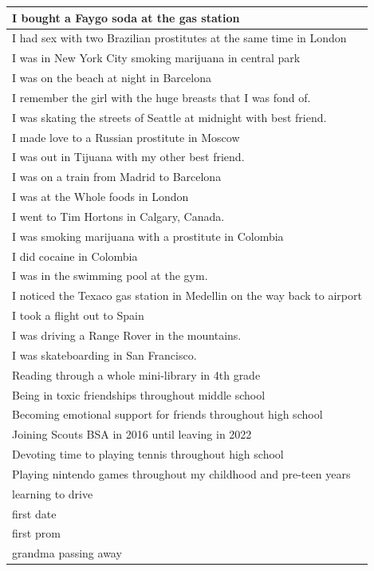 \documentclass[
  .7em,
  letterpaper,
  DIV=11,
  numbers=noendperiod]{scrartcl}
\begin{document}
\begin{table}
\begin{tabular}{l}
\hline
I bought a Faygo soda at the gas station\\
\hline
I had sex with two Brazilian prostitutes at the same time in London\\
\hline
I was in New York City smoking marijuana in central park\\
\hline
I was on the beach at night in Barcelona\\
\hline
I remember the girl with the huge breasts that I was fond of.\\
\hline
I was skating the streets of Seattle at midnight with best friend.\\
\hline
I made love to a Russian prostitute in Moscow\\
\hline
I was out in Tijuana with my other best friend.\\
\hline
I was on a train from Madrid to Barcelona\\
\hline
I was at the Whole foods in London\\
\hline
I went to Tim Hortons in Calgary, Canada.\\
\hline
I was smoking marijuana with a prostitute in Colombia\\
\hline
I did cocaine in Colombia\\
\hline
I was in the swimming pool at the gym.\\
\hline
I noticed the Texaco gas station in Medellin on the way back to airport\\
\hline
I took a flight out to Spain\\
\hline
I was driving a Range Rover in the mountains.\\
\hline
I was skateboarding in San Francisco.\\
\hline
Reading through a whole mini-library in 4th grade\\
\hline
Being in toxic friendships throughout middle school\\
\hline
Becoming emotional support for friends throughout high school\\
\hline
Joining Scouts BSA in 2016 until leaving in 2022\\
\hline
Devoting time to playing tennis throughout high school\\
\hline
Playing nintendo games throughout my childhood and pre-teen years\\
\hline
learning to drive\\
\hline
first date\\
\hline
first prom\\
\hline
grandma passing away\\

\end{tabular}
\end{table}
\end{document}
